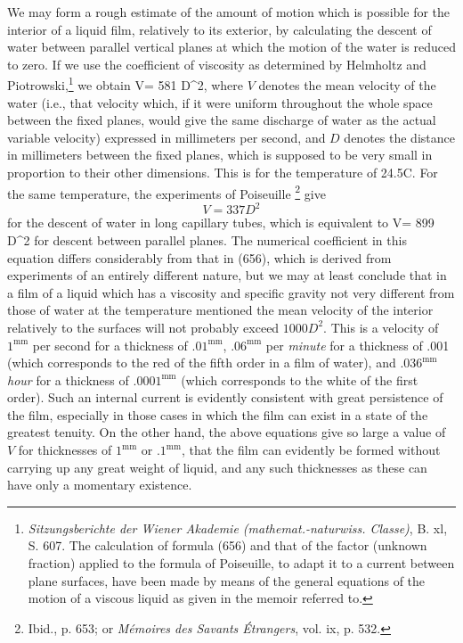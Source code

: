 \documentclass[12pt]{memoir}
\begin{document}
We may form a rough estimate of the amount of motion which is possible for the interior of a liquid film, relatively to its exterior, by calculating the descent of water between parallel vertical planes at which the motion of the water is reduced to zero. If we use the coefficient of viscosity as determined by Helmholtz and Piotrowski,\footnote{\textit{Sitzungsberichte der Wiener Akademie (mathemat.-naturwiss. Classe)}, B. xl, S. 607. The calculation of formula (656) and that of the factor (unknown fraction) %
applied to the formula of Poiseuille, to adapt it to a current between plane surfaces, have been made by means of the general equations of the motion of a viscous liquid as given in the memoir referred to.} we obtain
\eqs V= 581 D^2,    \label{656} \eqe
where $V$ denotes the mean velocity of the water (i.e., that velocity
which, if it were uniform throughout the whole space between the fixed planes, would give the same discharge of water as the actual variable velocity) expressed in millimeters per second, and $D$ denotes the distance in millimeters between the fixed planes, which is supposed to be very small in proportion to their other dimensions. This is for the temperature of 24.5\degree C. For the same temperature, the experiments of Poiseuille \footnote{Ibid., p. 653; or \textit{M\'{e}moires des Savants \'{E}trangers}, vol. ix, p. 532.} give
$$V= 337 D^2$$
for the descent of water in long capillary tubes, which is equivalent to
\eqs V= 899 D^2   \label{657} \eqe
for descent between parallel planes. The numerical coefficient in this equation differs considerably from that in (656), which is derived from experiments of an entirely different nature, but we may at least conclude that in a film of a liquid which has a viscosity and specific gravity not very different from those of water at the temperature mentioned the mean velocity of the interior relatively to the surfaces will not probably exceed $1000 D^2$. This is a velocity of $1^{\text{mm}}$ per second for a thickness of $.01^{\text{mm}}$, $.06^{\text{mm}}$ per \textit{minute} for a thickness of .001 (which corresponds to the red of the fifth order in a film of water), and $.036^{\text{mm}}$ \textit{hour} for a thickness of $.0001^{\text{mm}}$ (which corresponds to the white of the first order). Such an internal current is evidently consistent with great persistence of the film, especially in those cases in which the film can exist in a state of the greatest tenuity. On the other hand, the above equations give so large a value of $V$ for thicknesses of $1^{\text{mm}}$ or $.1^{\text{mm}}$, that the film can evidently be formed without carrying up any great weight of liquid, and any such thicknesses as these can have only a momentary existence.
\end{document}
